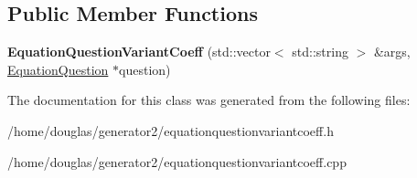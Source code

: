 \subsection*{Public Member Functions}
\begin{DoxyCompactItemize}
\item 
{\bfseries Equation\+Question\+Variant\+Coeff} (std\+::vector$<$ std\+::string $>$ \&args, \hyperlink{classEquationQuestion}{Equation\+Question} $\ast$question)\hypertarget{classEquationQuestionVariantCoeff_ad1e019414db35d6f1be8a2c125a91294}{}\label{classEquationQuestionVariantCoeff_ad1e019414db35d6f1be8a2c125a91294}

\end{DoxyCompactItemize}


The documentation for this class was generated from the following files\+:\begin{DoxyCompactItemize}
\item 
/home/douglas/generator2/equationquestionvariantcoeff.\+h\item 
/home/douglas/generator2/equationquestionvariantcoeff.\+cpp\end{DoxyCompactItemize}
